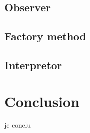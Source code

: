 \documentclass[a4paper]{article}
\begin{document}
		\subsection{Observer}
		\subsection{Factory method}
		\subsection{Interpretor}
	
	\newpage
	
	\section*{Conclusion}
		\paragraph{}{je conclu}
		
\end{document}
